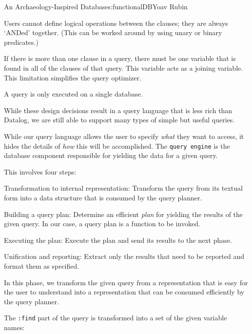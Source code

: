 \begin{aosachapter}{An Archaeology-Inspired Database}{s:functionalDB}{Yoav Rubin}
\begin{aosaitemize}
\item
  Users cannot define logical operations between the clauses; they are
  always `ANDed' together. (This can be worked around by using unary or
  binary predicates.)
\item
  If there is more than one clause in a query, there must be one
  variable that is found in all of the clauses of that query. This
  variable acts as a joining variable. This limitation simplifies the
  query optimizer.
\item
  A query is only executed on a single database.
\end{aosaitemize}

While these design decisions result in a query language that is less
rich than Datalog, we are still able to support many types of simple but
useful queries.

\label{query-engine-design}

While our query language allows the user to specify \emph{what} they
want to access, it hides the details of \emph{how} this will be
accomplished. The \texttt{query engine} is the database component
responsible for yielding the data for a given query.

This involves four steps:

\begin{aosaenumerate}
\def\labelenumi{\arabic{enumi}.}

\item
  Transformation to internal representation: Transform the query from
  its textual form into a data structure that is consumed by the query
  planner.
\item
  Building a query plan: Determine an efficient \emph{plan} for yielding
  the results of the given query. In our case, a query plan is a
  function to be invoked.
\item
  Executing the plan: Execute the plan and send its results to the next
  phase.
\item
  Unification and reporting: Extract only the results that need to be
  reported and format them as specified.
\end{aosaenumerate}

\label{phase-1-transformation}

In this phase, we transform the given query from a representation that
is easy for the user to understand into a representation that can be
consumed efficiently by the query planner.

The \texttt{:find} part of the query is transformed into a set of the
given variable names:


\end{aosachapter}
